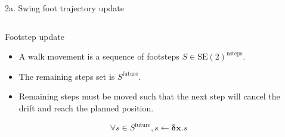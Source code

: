 \documentclass[hyperref={pdfpagelabels=false}]{beamer}
\begin{document}
\begin{frame}{2a. Swing foot trajectory update}

  \begin{columns}[c]
    \begin{column}{0.5\textwidth}

      \begin{block}{Footstep update}
        \begin{itemize}
        \item A walk movement is a sequence of footsteps $S \in \text{SE}(2)^{\text{nsteps}}$.
        \item The remaining steps set is $S^{\text{future}}$.
        \item Remaining steps must be moved such that the next step
          will cancel the drift and reach the planned position.
        \end{itemize}

        \begin{equation} \label{eq:footstepmodif}
          \forall s \in S^{\text{future}}, s \gets \mathbf{\delta {x}} . s
        \end{equation}
      \end{block}

    \end{column}

    \begin{column}{0.5\textwidth}
      \vspace{4cm}
      \begin{center}
\end{center}
\end{column}
\end{columns}
\end{frame}
\end{document}
